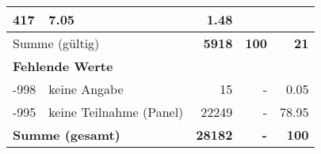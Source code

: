 \begin{longtable}{lXrrr}
       \num{417} &
       \num[round-mode=places,round-precision=2]{7.05} &
         \num[round-mode=places,round-precision=2]{1.48} \\
     \midrule
     \multicolumn{2}{l}{Summe (gültig)} &
       \textbf{\num{5918}} &
     \textbf{100} &
       \textbf{\num[round-mode=places,round-precision=2]{21}} \\
     \multicolumn{5}{l}{\textbf{Fehlende Werte}}\\
       -998 &
       keine Angabe &
         \num{15} &
        - &
         \num[round-mode=places,round-precision=2]{0.05} \\
       -995 &
       keine Teilnahme (Panel) &
         \num{22249} &
        - &
         \num[round-mode=places,round-precision=2]{78.95} \\
     \midrule
     \multicolumn{2}{l}{\textbf{Summe (gesamt)}} &
          \textbf{\num{28182}} &
        \textbf{-} &
        \textbf{100} \\
     \bottomrule
     \end{longtable}
     
